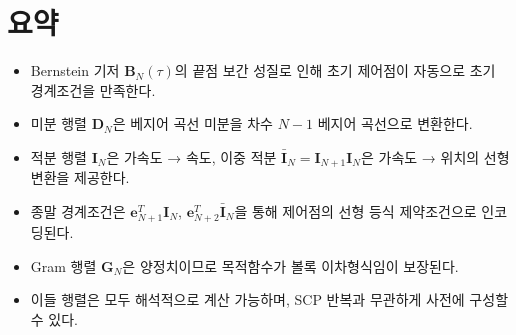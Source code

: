 \documentclass[11pt]{article}
\begin{document}
\section{요약}

\begin{itemize}
  \item Bernstein 기저 $\mathbf{B}_N(\tau)$의 끝점 보간 성질로 인해 초기 제어점이 자동으로 초기 경계조건을 만족한다.
  \item 미분 행렬 $\mathbf{D}_N$은 베지어 곡선 미분을 차수 $N-1$ 베지어 곡선으로 변환한다.
  \item 적분 행렬 $\mathbf{I}_N$은 가속도 → 속도, 이중 적분 $\bar{\mathbf{I}}_N = \mathbf{I}_{N+1}\mathbf{I}_N$은 가속도 → 위치의 선형 변환을 제공한다.
  \item 종말 경계조건은 $\mathbf{e}_{N+1}^T\mathbf{I}_N$, $\mathbf{e}_{N+2}^T\bar{\mathbf{I}}_N$을 통해 제어점의 선형 등식 제약조건으로 인코딩된다.
  \item Gram 행렬 $\mathbf{G}_N$은 양정치이므로 목적함수가 볼록 이차형식임이 보장된다.
  \item 이들 행렬은 모두 해석적으로 계산 가능하며, SCP 반복과 무관하게 사전에 구성할 수 있다.
\end{itemize}



\end{document}
